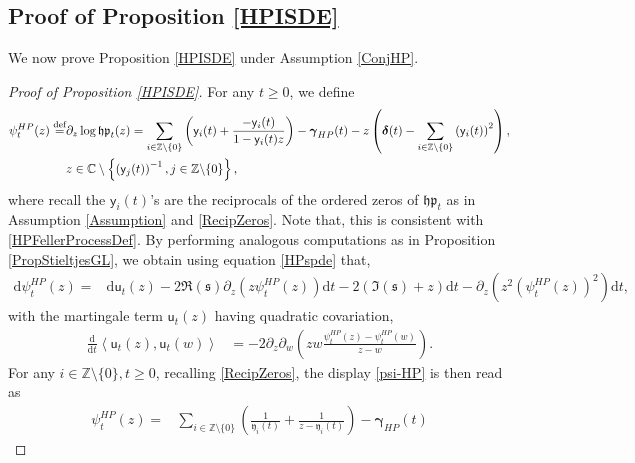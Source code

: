 \documentclass[]{article}
\begin{document}
\subsection{Proof of Proposition \ref{HPISDE}}

We now prove Proposition \ref{HPISDE} under Assumption \ref{ConjHP}.

\begin{proof}[Proof of Proposition \ref{HPISDE}]

For any $t\ge 0$, we define 
\begin{align}\label{psi-HP}
    \psi^{HP}_t(z)
    \overset{\textnormal{def}}{=}&
\partial_z
\log\mathfrak{hp}_t(z)
\nonumber=
\sum_{i\in \mathbb{Z}\backslash \{0\}}
\left(
\mathsf{y}_i(t)+
\frac{-\mathsf{y}_i(t)}{1-\mathsf{y}_i(t)z}
\right)
-
\boldsymbol{\gamma}_{HP}(t)-
z\left(\boldsymbol{\delta}(t)
-\sum_{i\in \mathbb{Z}\backslash \{0\}}
\left(\mathsf{y}_i(t)\right)^2\right),\\
&z\in\mathbb{C}\setminus
\left\{\left(\mathsf{y}_j(t)\right)^{-1}, j\in\mathbb{Z}\backslash\{0\}\right\},
\end{align}
where recall the $\mathsf{y}_i(t)$'s are the reciprocals of the ordered zeros of $\mathfrak{hp}_t$ as in Assumption \ref{Assumption} and \eqref{RecipZeros}. Note that, this is consistent with \eqref{HPFellerProcessDef}. By performing analogous computations as
in Proposition \ref{PropStieltjesGL}, we obtain using 
equation \eqref{HPspde} that,
\begin{align}\label{psiEqu-HP}
    \mathrm{d}\psi^{HP}_t(z)
    =&
    \mathrm{d}\mathsf{u}_t(z)
    -
   2\Re{(\mathfrak{s})}\partial_z\left(z\psi^{HP}_t(z)\right)\mathrm{d}t
    -
    2\left(\Im{(\mathfrak{s})}+z\right)
    \mathrm{d}t
    -
    \partial_z
    \left(z^2\left(\psi^{HP}_t(z)\right)^2\right)\mathrm{d}t,
\end{align}
with the martingale term $\mathsf{u}_t(z)$ having quadratic covariation,
\begin{align*}
\frac{\mathrm{d}}{\mathrm{d}t}\left\langle\mathsf{u}_t(z),
\mathsf{u}_t(w)
\right\rangle
&=
-2\partial_z\partial_w\left( zw\frac{\psi^{HP}_t(z)-\psi^{HP}_t(w)}{z-w}\right).
\end{align*}
For any $i\in\mathbb{Z}\setminus\{0\}, t\ge 0$, recalling 
\eqref{RecipZeros}, the display \eqref{psi-HP} is then read as
\begin{align}\label{psiInvPoints-HP}
    \psi^{HP}_t(z)
=&
\sum_{i\in\mathbb{Z}\setminus\{0\}}
\left(
\frac{1}{\mathfrak{y}_i(t)}+
\frac{1}{z-\mathfrak{y}_i(t)}
\right)-
\boldsymbol{\gamma}_{HP}(t)

\end{align}
\end{proof}
\end{document}
